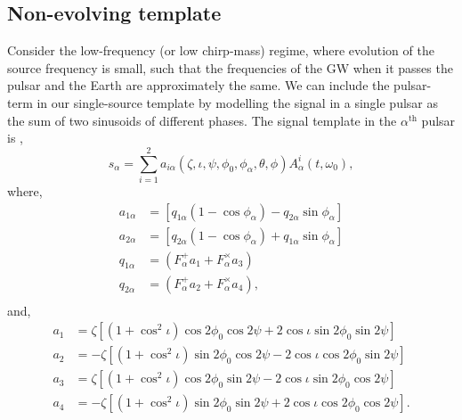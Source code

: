 \documentclass[prd,twocolumn,showpacs,nofootinbib]{revtex4}
\begin{document}
\subsection{Non-evolving template} \label{sec:NonEvolveTemplate}

Consider the low-frequency (or low chirp-mass) regime, where evolution of the source frequency is small, such that the frequencies of the GW when it passes the pulsar and the Earth are approximately the same. We can include the pulsar-term in our single-source template by modelling the signal in a single pulsar as the sum of two sinusoids of different phases. The signal template in the $\alpha^{\text{th}}$ pulsar is \citep{ellisoptimal2012},
\begin{equation}\label{eq:non-evolve-template}
s_{\alpha} = \sum_{i=1}^2 a_{i\alpha}(\zeta,\iota,\psi,\phi_0,\phi_{\alpha},\theta,\phi)A^i_{\alpha}(t,\omega_0),
\end{equation}
where,
\begin{align} \label{eq:aialpha}
a_{1\alpha} &= \left[q_{1\alpha}\left(1-\cos\phi_{\alpha}\right)-q_{2\alpha}\sin\phi_{\alpha}\right] \nonumber\\
a_{2\alpha} &= \left[q_{2\alpha}\left(1-\cos\phi_{\alpha}\right)+q_{1\alpha}\sin\phi_{\alpha}\right] \\
q_{1\alpha} &= \left(F^+_{\alpha}a_1+F^{\times}_{\alpha}a_3\right)\nonumber\\
q_{2\alpha} &= \left(F^+_{\alpha}a_2+F^{\times}_{\alpha}a_4\right),\\
\end{align} 
and,
\begin{align}
a_1 &= \zeta\left[\left(1+\cos^2\iota\right)\cos2\phi_0\cos2\psi + 2\cos\iota\sin2\phi_0\sin2\psi\right]  \nonumber\\
a_2 &= -\zeta\left[\left(1+\cos^2\iota\right)\sin2\phi_0\cos2\psi - 2\cos\iota\cos2\phi_0\sin2\psi\right]  \nonumber\\
a_3 &= \zeta\left[\left(1+\cos^2\iota\right)\cos2\phi_0\sin2\psi - 2\cos\iota\sin2\phi_0\cos2\psi\right]  \nonumber\\
a_4 &= -\zeta\left[\left(1+\cos^2\iota\right)\sin2\phi_0\sin2\psi + 2\cos\iota\cos2\phi_0\cos2\psi\right].
\end{align}
\end{document}

